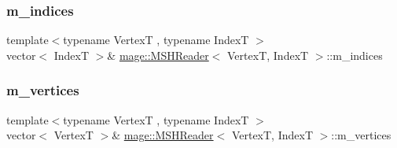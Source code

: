 \subsubsection{\texorpdfstring{m\+\_\+indices}{m\_indices}}
{\footnotesize\ttfamily template$<$typename VertexT , typename IndexT $>$ \\
vector$<$ IndexT $>$\& \hyperlink{classmage_1_1_m_s_h_reader}{mage\+::\+M\+S\+H\+Reader}$<$ VertexT, IndexT $>$\+::m\+\_\+indices\hspace{0.3cm}{\ttfamily [private]}}

\hypertarget{classmage_1_1_m_s_h_reader_a6b4c0fbf02771cb7bc0ebcb685c3c30b}{}\label{classmage_1_1_m_s_h_reader_a6b4c0fbf02771cb7bc0ebcb685c3c30b} 
\subsubsection{\texorpdfstring{m\+\_\+vertices}{m\_vertices}}
{\footnotesize\ttfamily template$<$typename VertexT , typename IndexT $>$ \\
vector$<$ VertexT $>$\& \hyperlink{classmage_1_1_m_s_h_reader}{mage\+::\+M\+S\+H\+Reader}$<$ VertexT, IndexT $>$\+::m\+\_\+vertices\hspace{0.3cm}{\ttfamily [private]}}

